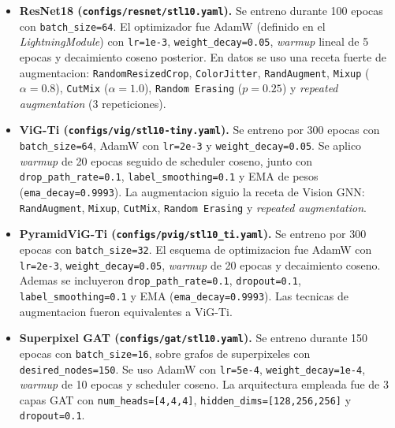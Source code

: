 \documentclass{article}
\begin{document}
\begin{itemize}
    \item \textbf{ResNet18 (\texttt{configs/resnet/stl10.yaml}).}
          Se entreno durante 100 epocas con \texttt{batch\_size=64}. El optimizador fue AdamW (definido en el \textit{LightningModule}) con \texttt{lr=1e-3}, \texttt{weight\_decay=0.05}, \textit{warmup} lineal de 5 epocas y decaimiento coseno posterior. En datos se uso una receta fuerte de augmentacion: \texttt{RandomResizedCrop}, \texttt{ColorJitter}, \texttt{RandAugment}, \texttt{Mixup} (\(\alpha=0.8\)), \texttt{CutMix} (\(\alpha=1.0\)), \texttt{Random Erasing} (\(p=0.25\)) y \textit{repeated augmentation} (3 repeticiones).

    \item \textbf{ViG-Ti (\texttt{configs/vig/stl10-tiny.yaml}).}
          Se entreno por 300 epocas con \texttt{batch\_size=64}, AdamW con \texttt{lr=2e-3} y \texttt{weight\_decay=0.05}. Se aplico \textit{warmup} de 20 epocas seguido de scheduler coseno, junto con \texttt{drop\_path\_rate=0.1}, \texttt{label\_smoothing=0.1} y EMA de pesos (\texttt{ema\_decay=0.9993}). La augmentacion siguio la receta de Vision GNN: \texttt{RandAugment}, \texttt{Mixup}, \texttt{CutMix}, \texttt{Random Erasing} y \textit{repeated augmentation}.

    \item \textbf{PyramidViG-Ti (\texttt{configs/pvig/stl10\_ti.yaml}).}
          Se entreno por 300 epocas con \texttt{batch\_size=32}. El esquema de optimizacion fue AdamW con \texttt{lr=2e-3}, \texttt{weight\_decay=0.05}, \textit{warmup} de 20 epocas y decaimiento coseno. Ademas se incluyeron \texttt{drop\_path\_rate=0.1}, \texttt{dropout=0.1}, \texttt{label\_smoothing=0.1} y EMA (\texttt{ema\_decay=0.9993}). Las tecnicas de augmentacion fueron equivalentes a ViG-Ti.

    \item \textbf{Superpixel GAT (\texttt{configs/gat/stl10.yaml}).}
          Se entreno durante 150 epocas con \texttt{batch\_size=16}, sobre grafos de superpixeles con \texttt{desired\_nodes=150}. Se uso AdamW con \texttt{lr=5e-4}, \texttt{weight\_decay=1e-4}, \textit{warmup} de 10 epocas y scheduler coseno. La arquitectura empleada fue de 3 capas GAT con \texttt{num\_heads=[4,4,4]}, \texttt{hidden\_dims=[128,256,256]} y \texttt{dropout=0.1}.
\end{itemize}
\end{document}
